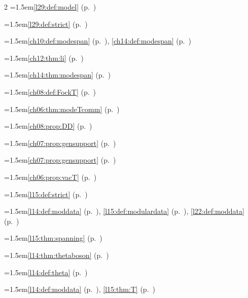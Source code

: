 \begin{multicols}{2}
\hangindent=1.5em\quad \ref{l29:def:model} (p.~\pageref{l29:def:model})\par
\hangindent=1.5em\quad \ref{l29:def:strict} (p.~\pageref{l29:def:strict})\par
\hangindent=1.5em\quad \ref{ch10:def:modespan} (p.~\pageref{ch10:def:modespan}), \ref{ch14:def:modespan} (p.~\pageref{ch14:def:modespan})\par
\hangindent=1.5em\quad \ref{ch12:thm:li} (p.~\pageref{ch12:thm:li})\par
\hangindent=1.5em\quad \ref{ch14:thm:modespan} (p.~\pageref{ch14:thm:modespan})\par
\hangindent=1.5em\quad \ref{ch08:def:FockT} (p.~\pageref{ch08:def:FockT})\par
\hangindent=1.5em\quad \ref{ch06:thm:modeTcomm} (p.~\pageref{ch06:thm:modeTcomm})\par
\hangindent=1.5em\quad \ref{ch08:prop:DD} (p.~\pageref{ch08:prop:DD})\par
\hangindent=1.5em\quad \ref{ch07:prop:gensupport} (p.~\pageref{ch07:prop:gensupport})\par
\hangindent=1.5em\quad \ref{ch07:prop:gensupport} (p.~\pageref{ch07:prop:gensupport})\par
\hangindent=1.5em\quad \ref{ch06:prop:vacT} (p.~\pageref{ch06:prop:vacT})\par
\hangindent=1.5em\quad \ref{l15:def:strict} (p.~\pageref{l15:def:strict})\par
\hangindent=1.5em\quad \ref{l14:def:moddata} (p.~\pageref{l14:def:moddata}), \ref{l15:def:modulardata} (p.~\pageref{l15:def:modulardata}), \ref{l22:def:moddata} (p.~\pageref{l22:def:moddata})\par
\hangindent=1.5em\quad \ref{l15:thm:spanning} (p.~\pageref{l15:thm:spanning})\par
\hangindent=1.5em\quad \ref{l14:thm:thetaboson} (p.~\pageref{l14:thm:thetaboson})\par
\hangindent=1.5em\quad \ref{l14:def:theta} (p.~\pageref{l14:def:theta})\par
\hangindent=1.5em\quad \ref{l14:def:moddata} (p.~\pageref{l14:def:moddata}), \ref{l15:thm:T} (p.~\pageref{l15:thm:T})\par

\end{multicols}
